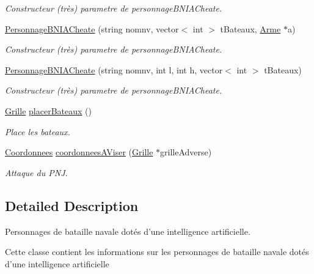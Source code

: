 \begin{DoxyCompactItemize}
\begin{DoxyCompactList}\small\item\em Constructeur (très) parametre de personnage\-B\-N\-I\-A\-Cheate. \end{DoxyCompactList}\item 
\hyperlink{classPersonnageBNIACheate_a11cfc16b65c677a73410fb46cc3ddd3a}{Personnage\-B\-N\-I\-A\-Cheate} (string nomnv, vector$<$ int $>$ t\-Bateaux, \hyperlink{classArme}{Arme} $\ast$a)
\begin{DoxyCompactList}\small\item\em Constructeur (très) parametre de personnage\-B\-N\-I\-A\-Cheate. \end{DoxyCompactList}\item 
\hyperlink{classPersonnageBNIACheate_ac663533e265cf49ff868b0eedb4de6a1}{Personnage\-B\-N\-I\-A\-Cheate} (string nomnv, int l, int h, vector$<$ int $>$ t\-Bateaux)
\begin{DoxyCompactList}\small\item\em Constructeur (très) parametre de personnage\-B\-N\-I\-A\-Cheate. \end{DoxyCompactList}\item 
\hyperlink{classGrille}{Grille} \hyperlink{classPersonnageBNIACheate_a76eabf30fe7ee8d8d00af7e4bac4cd3f}{placer\-Bateaux} ()
\begin{DoxyCompactList}\small\item\em Place les bateaux. \end{DoxyCompactList}\item 
\hyperlink{classCoordonnees}{Coordonnees} \hyperlink{classPersonnageBNIACheate_a7b81f85712b0f3d51427466b6fc4ebfd}{coordonnees\-A\-Viser} (\hyperlink{classGrille}{Grille} $\ast$grille\-Adverse)
\begin{DoxyCompactList}\small\item\em Attaque du P\-N\-J. \end{DoxyCompactList}\end{DoxyCompactItemize}


\subsection{Detailed Description}
Personnages de bataille navale dotés d'une intelligence artificielle. 

Cette classe contient les informations sur les personnages de bataille navale dotés d'une intelligence artificielle 

